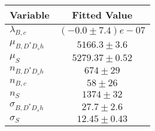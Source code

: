 \begin{tabular}[t]{lc}
\hline
Variable &Fitted Value\\
\hline\hline
$\lambda_{B,c}$&$(-0.0\pm7.4)e-07$\\
\hline
$\mu_{B, D^* D_s h}$&$5166.3\pm3.6$\\
\hline
$\mu_S$&$5279.37\pm0.52$\\
\hline
$n_{B, D^* D_s h}$&$674\pm29$\\
\hline
$n_{B,c}$&$58\pm26$\\
\hline
$n_S$&$1374\pm32$\\
\hline
$\sigma_{B, D^* D_s h}$&$27.7\pm2.6$\\
\hline
$\sigma_S$&$12.45\pm0.43$\\
\hline
\end{tabular}